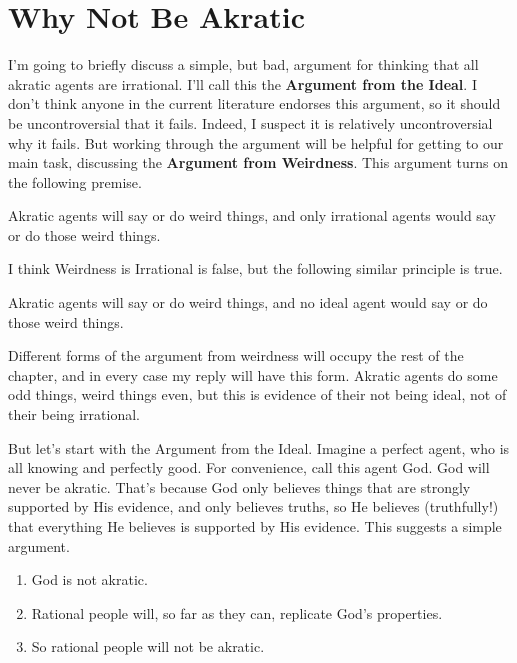 \documentclass[
  10pt,
  letterpaper,
  twoside]{scrbook}
\providecommand{\tightlist}{%
  \setlength{\itemsep}{0pt}\setlength{\parskip}{0pt}}\usepackage{longtable,booktabs,array}
\begin{document}
\section{Why Not Be Akratic}\label{whynotbeakratic}

I'm going to briefly discuss a simple, but bad, argument for thinking
that all akratic agents are irrational. I'll call this the
\textbf{Argument from the Ideal}. I don't think anyone in the current
literature endorses this argument, so it should be uncontroversial that
it fails. Indeed, I suspect it is relatively uncontroversial why it
fails. But working through the argument will be helpful for getting to
our main task, discussing the \textbf{Argument from Weirdness}. This
argument turns on the following premise.

\begin{description}
\tightlist
\item[Weirdness is Irrational]
Akratic agents will say or do weird things, and only irrational agents
would say or do those weird things.
\end{description}

I think Weirdness is Irrational is false, but the following similar
principle is true.

\begin{description}
\tightlist
\item[Weirdness is Non-Ideal]
Akratic agents will say or do weird things, and no ideal agent would say
or do those weird things.
\end{description}

Different forms of the argument from weirdness will occupy the rest of
the chapter, and in every case my reply will have this form. Akratic
agents do some odd things, weird things even, but this is evidence of
their not being ideal, not of their being irrational.

But let's start with the Argument from the Ideal. Imagine a perfect
agent, who is all knowing and perfectly good. For convenience, call this
agent God. God will never be akratic. That's because God only believes
things that are strongly supported by His evidence, and only believes
truths, so He believes (truthfully!) that everything He believes is
supported by His evidence. This suggests a simple argument.

\begin{enumerate}
\def\labelenumi{\arabic{enumi}.}
\tightlist
\item
  God is not akratic.
\item
  Rational people will, so far as they can, replicate God's properties.
\item
  So rational people will not be akratic.
\end{enumerate}
\end{document}
